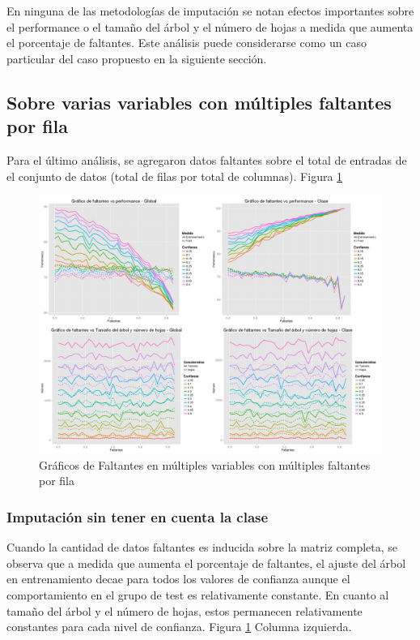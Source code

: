 \documentclass[]{article}
\begin{document}
En ninguna de las metodologías de imputación se notan efectos importantes sobre el performance o el tamaño del árbol y el número de hojas a medida que aumenta el porcentaje de faltantes. Este análisis puede considerarse como un caso particular del caso propuesto en la siguiente sección.

\subsection{Sobre varias variables con múltiples faltantes por fila}
Para el último análisis, se agregaron datos faltantes sobre el total de entradas de el conjunto de datos (total de filas por total de columnas). Figura \ref{1.P2MultVarMultFil}

\begin{figure}[H]
	\includegraphics[scale = 0.27]{2_1_Mult_Col_Mult_Fil}
	\caption[[Faltantes Múltiples variables Múltiples Filas]{Gráficos de Faltantes en múltiples variables con múltiples faltantes por fila}
	\label{1.P2MultVarMultFil}
\end{figure}

\subsubsection{Imputación sin tener en cuenta la clase}
Cuando la cantidad de datos faltantes es inducida sobre la matriz completa, se observa que a medida que aumenta el porcentaje de faltantes, el ajuste del árbol en entrenamiento decae para todos los valores de confianza aunque el comportamiento en el grupo de test es relativamente constante. En cuanto al tamaño del árbol y el número de hojas, estos permanecen relativamente constantes para cada nivel de confianza. Figura \ref{1.P2MultVarMultFil} Columna izquierda.
\end{document}
